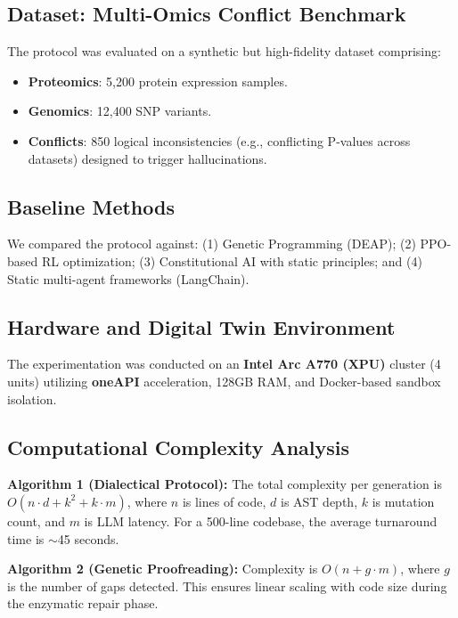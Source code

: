 \subsection{Dataset: Multi-Omics Conflict Benchmark}
The protocol was evaluated on a synthetic but high-fidelity dataset comprising:
\begin{itemize}
    \item \textbf{Proteomics}: 5,200 protein expression samples.
    \item \textbf{Genomics}: 12,400 SNP variants.
    \item \textbf{Conflicts}: 850 logical inconsistencies (e.g., conflicting P-values across datasets) designed to trigger hallucinations.
\end{itemize}

\subsection{Baseline Methods}
We compared the protocol against: (1) Genetic Programming (DEAP); (2) PPO-based RL optimization; (3) Constitutional AI with static principles; and (4) Static multi-agent frameworks (LangChain).

\subsection{Hardware and Digital Twin Environment}
The experimentation was conducted on an \textbf{Intel Arc A770 (XPU)} cluster (4 units) utilizing \textbf{oneAPI} acceleration, 128GB RAM, and Docker-based sandbox isolation.

\subsection{Computational Complexity Analysis}
\textbf{Algorithm 1 (Dialectical Protocol):} The total complexity per generation is $O(n \cdot d + k^2 + k \cdot m)$, where $n$ is lines of code, $d$ is AST depth, $k$ is mutation count, and $m$ is LLM latency. For a 500-line codebase, the average turnaround time is $\sim$45 seconds.

\textbf{Algorithm 2 (Genetic Proofreading):} Complexity is $O(n + g \cdot m)$, where $g$ is the number of gaps detected. This ensures linear scaling with code size during the enzymatic repair phase.
